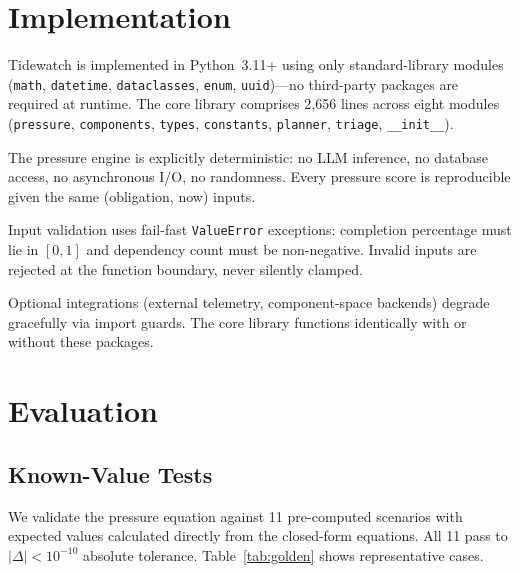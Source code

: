 \documentclass[11pt]{article}
\begin{document}
\section{Implementation}
\label{sec:implementation}

Tidewatch is implemented in Python~3.11+ using only standard-library
modules (\texttt{math}, \texttt{datetime}, \texttt{dataclasses},
\texttt{enum}, \texttt{uuid})---no third-party packages are
required at runtime.
The core library comprises 2{,}656 lines across eight modules
(\texttt{pressure}, \texttt{components}, \texttt{types},
\texttt{constants}, \texttt{planner}, \texttt{triage},
\texttt{\_\_init\_\_}).

The pressure engine is explicitly deterministic: no LLM inference,
no database access, no asynchronous I/O, no randomness.  Every
pressure score is reproducible given the same (obligation, now)
inputs.

Input validation uses fail-fast \texttt{ValueError} exceptions:
completion percentage must lie in $[0, 1]$ and dependency count
must be non-negative.  Invalid inputs are rejected at the function
boundary, never silently clamped.

Optional integrations (external telemetry, component-space
backends) degrade gracefully via import guards.  The core
library functions identically with or without these packages.

\section{Evaluation}
\label{sec:eval}

\subsection{Known-Value Tests}
\label{sec:golden}

We validate the pressure equation against 11 pre-computed scenarios
with expected values calculated directly from the closed-form
equations.  All 11 pass to $|\Delta| < 10^{-10}$ absolute tolerance.
Table~\ref{tab:golden} shows representative cases.
\end{document}
